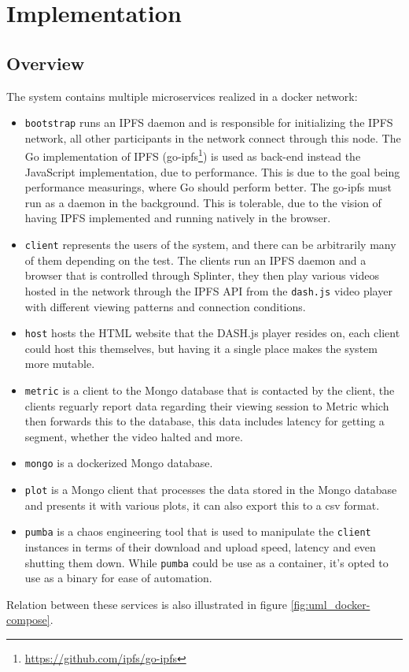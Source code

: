 \chapter{Implementation}
\label{cha:implementation}
\section{Overview}
\label{sec:impl-overview}
The system  contains multiple microservices realized in a docker network:
\begin{itemize}
    \item \texttt{bootstrap} runs an IPFS daemon and is responsible for initializing the IPFS network, all other participants in the network connect through this node. 
    The Go implementation of \acs{IPFS} (go-ipfs\footnote{\url{https://github.com/ipfs/go-ipfs}}) is used as back-end instead the JavaScript implementation, due to performance. This is due to the goal being performance measurings, where Go should perform better. The go-ipfs must run as a daemon in the background. This is tolerable, due to the vision of having IPFS implemented and running natively in the browser.
    \item \texttt{client} represents the users of the system, and there can be arbitrarily many of them depending on the test. The clients run an IPFS daemon and a browser that is controlled through Splinter, they then play various videos hosted in the network through the IPFS \acs{API} from the \texttt{dash.js} video player with different viewing patterns and connection conditions.
    \item \texttt{host} hosts the HTML website that the DASH.js player resides on, each client could host this themselves, but having it a single place makes the system more mutable.
    \item \texttt{metric} is a client to the Mongo database that is contacted by the client, the clients reguarly report data regarding their viewing session to Metric which then forwards this to the database, this data includes latency for getting a segment, whether the video halted and more.
    \item \texttt{mongo} is a dockerized Mongo database.
    \item \texttt{plot} is a Mongo client that processes the data stored in the Mongo database and presents it with various plots, it can also export this to a csv format.
    \item \texttt{pumba} is a chaos engineering tool that is used to manipulate the \texttt{client} instances in terms of their download and upload speed, latency and even shutting them down. While \texttt{pumba} could be use as a container, it's opted to use as a binary for ease of automation. 
\end{itemize}
Relation between these services is also  illustrated in figure \ref{fig:uml_docker-compose}.


